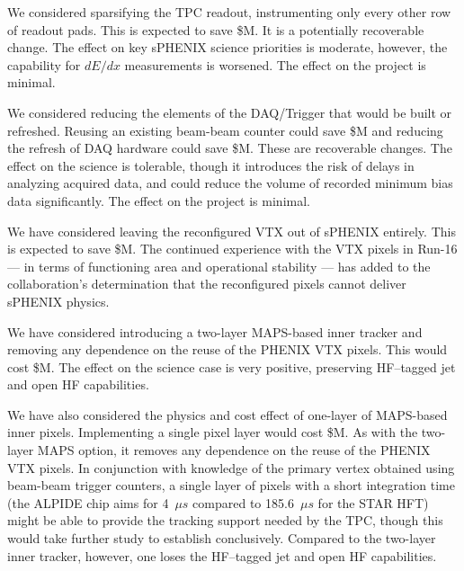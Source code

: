 We considered sparsifying the TPC readout, instrumenting only every
other row of readout pads.  This is expected to save
\${\reducedTPCreadout}M.  It is a potentially recoverable change. The
effect on key sPHENIX science priorities is moderate, however, the
capability for $dE/dx$ measurements is worsened.  The effect on the
project is minimal.

We considered reducing the elements of the DAQ/Trigger that would be
built or refreshed.  Reusing an existing beam-beam counter could save
\${\reuseBBC}M and reducing the refresh of DAQ hardware could save
\${\reducedDAQ}M.  These are recoverable changes.  The effect on the
science is tolerable, though it introduces the risk of delays in
analyzing acquired data, and could reduce the volume of recorded
minimum bias data significantly. The effect on the project is minimal.

We have considered leaving the reconfigured VTX out of sPHENIX
entirely.  This is expected to save \${\noVTX}M.  The continued experience
with the VTX pixels in Run-16 --- in terms of functioning area and
operational stability --- has added to the collaboration's
determination that the reconfigured pixels cannot deliver sPHENIX
physics. 

We have considered introducing a two-layer MAPS-based inner tracker
and removing any dependence on the reuse of the PHENIX VTX pixels.
This would cost \${\twoLayerMAPS}M.  The effect on the science case is very
positive, preserving HF--tagged jet and open HF capabilities. 

We have also considered the physics and cost effect of one-layer of
MAPS-based inner pixels.  Implementing a single pixel layer would cost
\${\oneLayerMAPS}M.  As with the two-layer MAPS option, it removes any
dependence on the reuse of the PHENIX VTX pixels.  In conjunction with
knowledge of the primary vertex obtained using beam-beam trigger
counters, a single layer of pixels with a short integration time (the
ALPIDE chip aims for 4~$\mu s$ compared to 185.6~$\mu s$ for the STAR
HFT) might be able to provide the tracking support needed by the TPC,
though this would take further study to establish conclusively.
Compared to the two-layer inner tracker, however, one loses the
HF--tagged jet and open HF capabilities.






